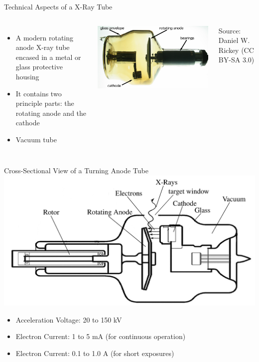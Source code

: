 \begin{frame}[c]{Technical Aspects of a X-Ray Tube}
    \begin{columns}[c]
        \begin{itemize}
            \item A modern rotating anode X-ray tube encased in a metal or glass protective housing
            \item It contains two principle parts: the rotating anode and the cathode
            \item Vacuum tube
        \end{itemize}
        \includegraphics[width=\textwidth]{images/Rotating_anode_x-ray_tube_(labeled).jpg}

        \begin{flushright}
            \tiny Source: Daniel W. Rickey (CC BY-SA 3.0)
        \end{flushright}
    \end{columns}
\end{frame}



\begin{frame}{Cross-Sectional View of a Turning Anode Tube}
    \centering
    \includegraphics[height=0.65\textheight]{images/xraytube}\\
    \begin{itemize}
        \item Acceleration Voltage: 20 to 150 kV
        \item Electron Current: 1 to 5 mA (for continuous operation)
        \item Electron Current: 0.1 to 1.0 A (for short exposures)
    \end{itemize}

\end{frame}


